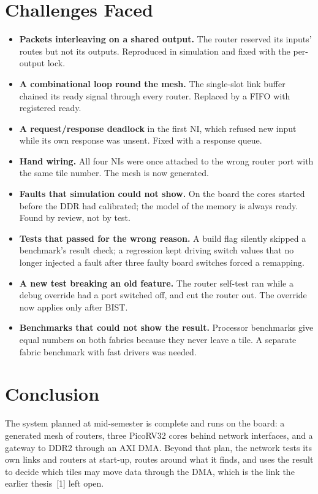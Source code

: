 \documentclass[11pt,a4paper]{article}
\begin{document}
\section{Challenges Faced}

\begin{itemize}
\item \textbf{Packets interleaving on a shared output.} The router reserved
its inputs' routes but not its outputs. Reproduced in simulation and fixed
with the per-output lock.
\item \textbf{A combinational loop round the mesh.} The single-slot link
buffer chained its ready signal through every router. Replaced by a FIFO with
registered ready.
\item \textbf{A request/response deadlock} in the first NI, which refused new
input while its own response was unsent. Fixed with a response queue.
\item \textbf{Hand wiring.} All four NIs were once attached to the wrong
router port with the same tile number. The mesh is now generated.
\item \textbf{Faults that simulation could not show.} On the board the cores
started before the DDR had calibrated; the model of the memory is always
ready. Found by review, not by test.
\item \textbf{Tests that passed for the wrong reason.} A build flag silently
skipped a benchmark's result check; a regression kept driving switch values
that no longer injected a fault after three faulty board switches forced a
remapping.
\item \textbf{A new test breaking an old feature.} The router self-test ran
while a debug override had a port switched off, and cut the router out. The
override now applies only after BIST.
\item \textbf{Benchmarks that could not show the result.} Processor
benchmarks give equal numbers on both fabrics because they never leave a
tile. A separate fabric benchmark with fast drivers was needed.
\end{itemize}

\section{Conclusion}

The system planned at mid-semester is complete and runs on the board: a generated mesh of routers, three PicoRV32 cores
behind network interfaces, and a gateway to DDR2 through an AXI DMA. Beyond
that plan, the network tests its own links and routers at start-up, routes
around what it finds, and uses the result to decide which tiles may move data
through the DMA, which is the link the earlier thesis~[1] left open.
\end{document}
